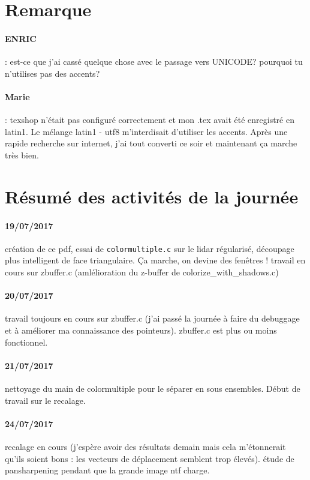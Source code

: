 \documentclass{article}
\begin{document}
\section{Remarque}


\paragraph{ENRIC}: est-ce que j'ai cassé quelque chose avec le passage vers UNICODE?
 pourquoi tu n'utilises pas des accents?
\paragraph{Marie}: texshop n'était pas configuré correctement et mon .tex avait été enregistré en latin1. Le mélange latin1 - utf8 m'interdisait d'utiliser les accents. Après une rapide recherche sur internet, j'ai tout converti ce soir et maintenant \c ca marche très bien.

\section{Résumé des activités de la journée}
\paragraph{19/07/2017} création de ce pdf, essai de \verb"colormultiple.c" sur le lidar régularisé, découpage plus intelligent de face triangulaire. \c Ca marche, on devine des fenêtres ! travail en cours sur zbuffer.c (amlélioration du z-buffer de colorize\_with\_shadows.c)
\paragraph{20/07/2017}  travail toujours en cours sur zbuffer.c (j'ai passé la journée à faire du debuggage et à améliorer ma connaissance des pointeurs). zbuffer.c est plus ou moins fonctionnel. 
\paragraph{21/07/2017} nettoyage du main de colormultiple pour le séparer en sous ensembles. Début de travail sur le recalage.
\paragraph{24/07/2017} recalage en cours (j'espère avoir des résultats demain mais cela m'étonnerait qu'ils soient bons : les vecteurs de d\'eplacement semblent trop élevés). étude de pansharpening pendant que la grande image ntf charge.
\end{document}
